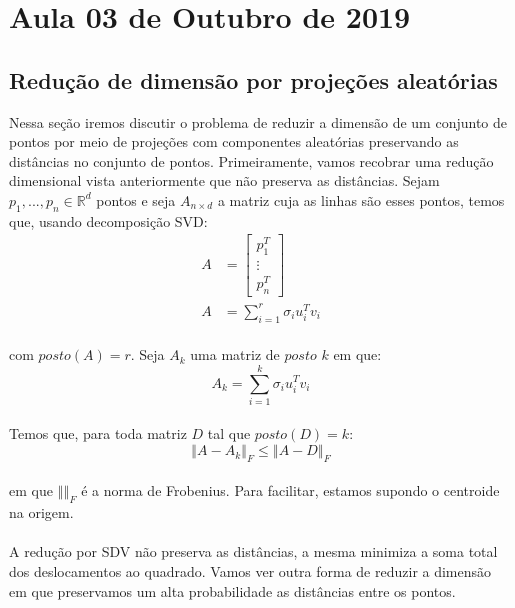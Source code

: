 \section{Aula 03 de Outubro de 2019}
\label{2019_10_03}

\subsection{Redução de dimensão por projeções aleatórias}
Nessa seção iremos discutir o problema de reduzir a dimensão de um conjunto de pontos por meio de projeções com componentes aleatórias preservando as distâncias no conjunto de pontos. Primeiramente, vamos recobrar uma redução dimensional vista anteriormente que não preserva as distâncias.
Sejam $p_1,...,p_n \in \mathbb{R}^d$ pontos e seja $A_{n \times d}$ a matriz cuja as linhas são esses pontos, temos que, usando decomposição SVD:
\begin{align*}
A &=
  \begin{bmatrix}
    p_1^T \\
    \vdots \\
    p_n^T
  \end{bmatrix}\\
   A &= \sum\limits_{i = 1}^r \sigma_i u_i^T v_i    
\end{align*}

\paragraph{}com $posto(A) = r$. Seja $A_k$ uma matriz de $posto$ $k$ em que: 
\begin{equation*}
    A_k = \sum\limits_{i = 1}^k \sigma_i u_i^T v_i    
\end{equation*}
\paragraph{}Temos que, para toda matriz $D$ tal que $ posto(D)=k$:
\begin{equation*}
    \left\Vert A - A_k \right\Vert_F \leq \left\Vert A - D \right\Vert_F
\end{equation*}
\paragraph{}em que $\left\Vert \right\Vert_F$ é a norma de Frobenius. Para facilitar, estamos supondo o centroide na origem.
\paragraph{}A redução por SDV não preserva as distâncias, a mesma minimiza a soma total dos deslocamentos ao quadrado. Vamos ver outra forma de reduzir a dimensão em que preservamos um alta probabilidade as distâncias entre os pontos.
